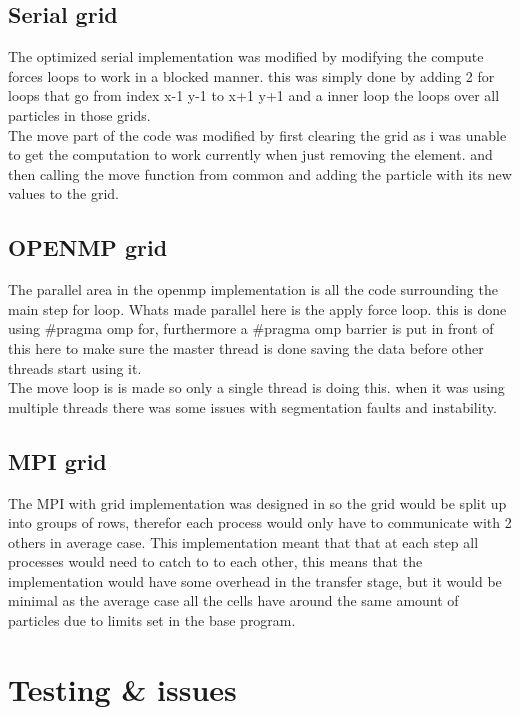 \documentclass[a4paper,10pt,titlepage]{report}
\begin{document}
\subsection{Serial grid}

The optimized serial implementation was modified by modifying the compute forces loops to work in a blocked manner. this was simply done by adding 2 for loops that go from index x-1 y-1 to x+1 y+1 and a inner loop the loops over all particles in those grids.\\
The move part of the code was modified by first clearing the grid as i was unable to get the computation to work currently when just removing the element. and then calling the move function from common and adding the particle with its new values to the grid. 

\subsection{OPENMP grid}
The parallel area in the openmp implementation is all the code surrounding the main step for loop. Whats made parallel here is the apply force loop. this is done using \#pragma omp for, furthermore a \#pragma omp barrier is put in front of this here to make sure the master thread is done saving the data before other threads start using it. \\

The move loop is is made so only a single thread is doing this. when it was using multiple threads there was some issues with segmentation faults and instability. \\

\subsection{MPI grid}
The MPI with grid implementation was designed in so the grid would be split up into groups of rows, therefor each process would only have to communicate with 2 others in average case. This implementation meant that that at each step all processes would need to catch to to each other, this means that the implementation would have some overhead in the transfer stage, but it would be minimal as the average case all the cells have around the same amount of particles due to limits set in the base program. \\


\newpage
\section{Testing \& issues}
\end{document}
